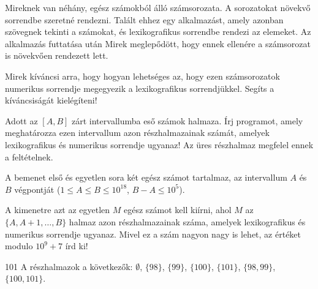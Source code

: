 





Mireknek van néhány, egész számokból álló számsorozata. A sorozatokat növekvő sorrendbe szeretné rendezni. Talált ehhez egy alkalmazást, amely azonban szövegnek tekinti a számokat, és lexikografikus sorrendbe rendezi az elemeket. Az alkalmazás futtatása után Mirek meglepődött, hogy ennek ellenére a számsorozat is növekvően rendezett lett. 

Mirek kíváncsi arra, hogy hogyan lehetséges az, hogy ezen számsorozatok numerikus sorrendje megegyezik a lexikografikus sorrendjükkel. Segíts a kíváncsiságát kielégíteni!

Adott az $[A, B]$ zárt intervallumba eső számok halmaza. Írj programot, amely meghatározza ezen intervallum azon részhalmazainak számát, amelyek lexikografikus és numerikus sorrendje ugyanaz! Az üres részhalmaz megfelel ennek a feltételnek.

A bemenet első és egyetlen sora két egész számot tartalmaz, az intervallum $A$ és $B$ végpontját ($1 \le A \le B \le 10^{18}$, $B - A \le 10^5$).

A kimenetre azt az egyetlen $M$ egész számot kell kiírni, ahol $M$ az $\{A, A+1, \ldots, B\}$ halmaz azon rész\-halma\-zainak száma, amelyek lexikografikus és numerikus sorrendje ugyanaz. Mivel ez a szám nagyon nagy is lehet, az értéket modulo $10^9 + 7$ írd ki!



 101
\sampleCOMMENT
A részhalmazok a következők: $\emptyset$, $\{98\}$, $\{99\}$, $\{100\}$, $\{101\}$, $\{98, 99\}$, $\{100, 101\}$.
\sampleEND



